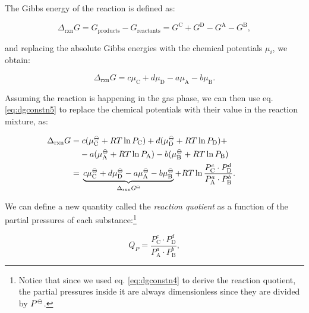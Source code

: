 \documentclass[
  9pt,
]{extbook}
\theoremstyle{definition}
\theoremstyle{definition}
\theoremstyle{definition}
\theoremstyle{definition}
\theoremstyle{remark}
\begin{document}
The Gibbs energy of the reaction is defined as:

\begin{equation}
\Delta_{\text{rxn}} G = G_{\text{products}} - G_{\text{reactants}} = G^{\text{C}} + G^{\text{D}} - G^{\text{A}}-G^{\text{B}},
\label{eq:chemeq1}
\end{equation}

and replacing the absolute Gibbs energies with the chemical potentials \(\mu_i\), we obtain:

\begin{equation}
\Delta_{\text{rxn}} G = c \mu_{\text{C}} + d \mu_{\text{D}} - a \mu_{\text{A}}- b\mu_{\text{B}}.
\label{eq:chemeq2}
\end{equation}

Assuming the reaction is happening in the gas phase, we can then use eq. \eqref{eq:dgconstn5} to replace the chemical potentials with their value in the reaction mixture, as:

\begin{equation}
\begin{aligned}
\mkern-60mu \Delta_{\text{rxn}} G =& \; c (\mu_{\text{C}}^{-\kern-6pt{\ominus}\kern-6pt-}+RT \ln P_{\text{C}}) + d (\mu_{\text{D}}^{-\kern-6pt{\ominus}\kern-6pt-}+RT \ln P_{\text{D}}) +\\ & - a (\mu_{\text{A}}^{-\kern-6pt{\ominus}\kern-6pt-}+RT \ln P_{\text{A}}) - b (\mu_{\text{B}}^{-\kern-6pt{\ominus}\kern-6pt-}+RT \ln P_{\text{B}}) \\
  =& \; \underbrace{c \mu_{\text{C}}^{-\kern-6pt{\ominus}\kern-6pt-}+ d \mu_{\text{D}}^{-\kern-6pt{\ominus}\kern-6pt-}- a \mu_{\text{A}}^{-\kern-6pt{\ominus}\kern-6pt-}- b\mu_{\text{B}}^{-\kern-6pt{\ominus}\kern-6pt-}}_{\Delta_{\text{rxn}} G^{-\kern-6pt{\ominus}\kern-6pt-}}  +RT \ln \frac{P_{\text{C}}^c \cdot P_{\text{D}}^d}{P_{\text{A}}^a \cdot P_{\text{B}}^b}.
\end{aligned}
\label{eq:chemeq3}
\end{equation}

We can define a new quantity called the \emph{reaction quotient} as a function of the partial pressures of each substance:\footnote{Notice that since we used eq. \eqref{eq:dgconstn4} to derive the reaction quotient, the partial pressures inside it are always dimensionless since they are divided by \(P^{-\kern-6pt{\ominus}\kern-6pt-}\).}

\begin{equation}
Q_P = \frac{P_{\text{C}}^c \cdot P_{\text{D}}^d}{P_{\text{A}}^a \cdot P_{\text{B}}^b},
\label{eq:chemeq4}
\end{equation}
\end{document}
